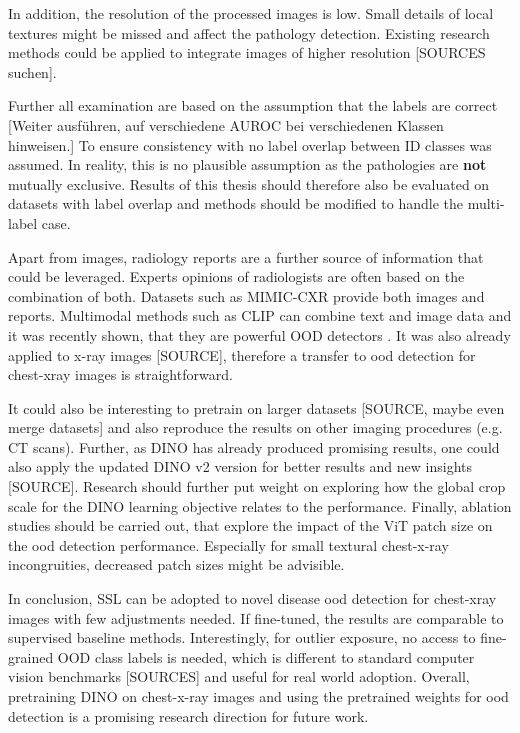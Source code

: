 In addition, the resolution of the processed images is low. 
Small details of local textures might be missed and affect the pathology detection. 
Existing research methods could be applied to integrate images of higher resolution [SOURCES suchen].
\par
Further all examination are based on the assumption that the labels are correct [Weiter ausführen, auf verschiedene AUROC bei verschiedenen Klassen hinweisen.]
To ensure consistency with \citep{Berger2021} no label overlap between ID classes was assumed. 
In reality, this is no plausible assumption as the pathologies are \textbf{not} mutually exclusive.
Results of this thesis should therefore also be evaluated on datasets with label overlap and methods should be modified to handle the multi-label case.
\par
Apart from images, radiology reports are a further source of information that could be leveraged. 
Experts opinions of radiologists are often based on the combination of both. 
Datasets such as MIMIC-CXR \citep{Johnson2019} provide both images and reports. 
Multimodal methods such as CLIP \citep{Radford2021} can combine text and image data and it was recently shown, that they are powerful OOD detectors \citep{Michels2023}.
It was also already applied to x-ray images [SOURCE], therefore a transfer to ood detection for chest-xray images is straightforward.
\par
It could also be interesting to pretrain on larger datasets [SOURCE, maybe even merge datasets] and also reproduce the results on other imaging procedures (e.g. CT scans).
Further, as DINO has already produced promising results, one could also apply the updated DINO v2 version for better results and new insights [SOURCE].
Research should further put weight on exploring how the global crop scale for the DINO learning objective relates to the performance.
Finally, ablation studies should be carried out, that explore the impact of the ViT patch size on the ood detection performance.
Especially for small textural chest-x-ray incongruities, decreased patch sizes might be advisible.
\par
In conclusion, SSL can be adopted to novel disease ood detection for chest-xray images with few adjustments needed.
If fine-tuned, the results are comparable to supervised baseline methods.
Interestingly, for outlier exposure, no access to fine-grained OOD class labels is needed, which is different to standard computer vision benchmarks [SOURCES] and useful for real world adoption.
Overall, pretraining DINO on chest-x-ray images and using the pretrained weights for ood detection is a promising research direction for future work.
